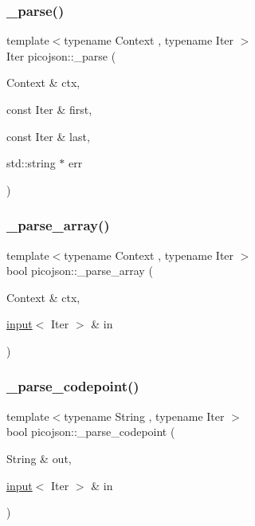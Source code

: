 \subsubsection{\texorpdfstring{\+\_\+parse()}{\_parse()}\hspace{0.1cm}{\footnotesize\ttfamily [2/2]}}
{\footnotesize\ttfamily template$<$typename Context , typename Iter $>$ \\
Iter picojson\+::\+\_\+parse (\begin{DoxyParamCaption}\item[{Context \&}]{ctx,  }\item[{const Iter \&}]{first,  }\item[{const Iter \&}]{last,  }\item[{std\+::string $\ast$}]{err }\end{DoxyParamCaption})\hspace{0.3cm}{\ttfamily [inline]}}

\hypertarget{namespacepicojson_adcae039b132c6c96d2b2d9e786a04a88}{}\label{namespacepicojson_adcae039b132c6c96d2b2d9e786a04a88} 
\subsubsection{\texorpdfstring{\+\_\+parse\+\_\+array()}{\_parse\_array()}}
{\footnotesize\ttfamily template$<$typename Context , typename Iter $>$ \\
bool picojson\+::\+\_\+parse\+\_\+array (\begin{DoxyParamCaption}\item[{Context \&}]{ctx,  }\item[{\hyperlink{classpicojson_1_1input}{input}$<$ Iter $>$ \&}]{in }\end{DoxyParamCaption})\hspace{0.3cm}{\ttfamily [inline]}}

\hypertarget{namespacepicojson_a05316c2614f3e7a4559ce1d1003eb051}{}\label{namespacepicojson_a05316c2614f3e7a4559ce1d1003eb051} 
\subsubsection{\texorpdfstring{\+\_\+parse\+\_\+codepoint()}{\_parse\_codepoint()}}
{\footnotesize\ttfamily template$<$typename String , typename Iter $>$ \\
bool picojson\+::\+\_\+parse\+\_\+codepoint (\begin{DoxyParamCaption}\item[{String \&}]{out,  }\item[{\hyperlink{classpicojson_1_1input}{input}$<$ Iter $>$ \&}]{in }\end{DoxyParamCaption})\hspace{0.3cm}{\ttfamily [inline]}}

